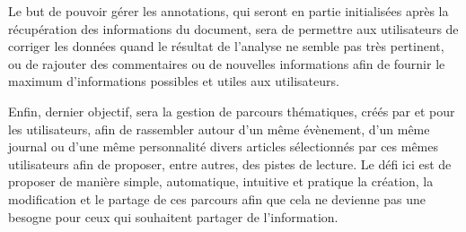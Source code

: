     Le but de pouvoir gérer les annotations, qui seront en partie initialisées après la récupération des informations du document, sera de permettre aux utilisateurs de corriger les données quand le résultat de l’analyse ne semble pas très pertinent, ou de rajouter des commentaires ou de nouvelles informations afin de fournir le maximum d’informations possibles et utiles aux utilisateurs.

    Enfin, dernier objectif, sera la gestion de parcours thématiques, créés par et pour les utilisateurs, afin de rassembler autour d’un même évènement, d’un même journal ou d’une même personnalité divers articles sélectionnés par ces mêmes utilisateurs afin de proposer, entre autres, des pistes de lecture. Le défi ici est de proposer de manière simple, automatique, intuitive et pratique la création, la modification et le partage de ces parcours afin que cela ne devienne pas une besogne pour ceux qui souhaitent partager de l’information.

